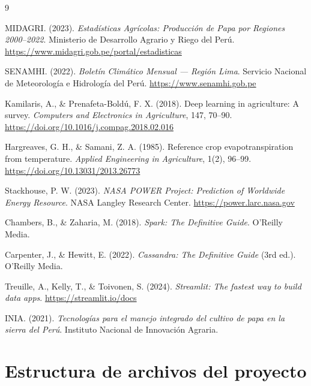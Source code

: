 \documentclass[12pt,a4paper]{article}
\begin{document}
\begin{thebibliography}{9}

MIDAGRI. (2023). \textit{Estadísticas Agrícolas: Producción de Papa por
Regiones 2000--2022}. Ministerio de Desarrollo Agrario y Riego del Perú.
\url{https://www.midagri.gob.pe/portal/estadisticas}

SENAMHI. (2022). \textit{Boletín Climático Mensual — Región Lima}.
Servicio Nacional de Meteorología e Hidrología del Perú.
\url{https://www.senamhi.gob.pe}

Kamilaris, A., \& Prenafeta-Boldú, F. X. (2018). Deep learning in
agriculture: A survey. \textit{Computers and Electronics in Agriculture},
147, 70--90. \url{https://doi.org/10.1016/j.compag.2018.02.016}

Hargreaves, G. H., \& Samani, Z. A. (1985). Reference crop
evapotranspiration from temperature. \textit{Applied Engineering in
Agriculture}, 1(2), 96--99. \url{https://doi.org/10.13031/2013.26773}

Stackhouse, P. W. (2023). \textit{NASA POWER Project: Prediction of
Worldwide Energy Resource}. NASA Langley Research Center.
\url{https://power.larc.nasa.gov}

Chambers, B., \& Zaharia, M. (2018). \textit{Spark: The Definitive Guide}.
O'Reilly Media.

Carpenter, J., \& Hewitt, E. (2022). \textit{Cassandra: The Definitive
Guide} (3rd ed.). O'Reilly Media.

Treuille, A., Kelly, T., \& Toivonen, S. (2024). \textit{Streamlit: The
fastest way to build data apps}. \url{https://streamlit.io/docs}

INIA. (2021). \textit{Tecnologías para el manejo integrado del cultivo de
papa en la sierra del Perú}. Instituto Nacional de Innovación Agraria.

\end{thebibliography}

\appendix
\section{Estructura de archivos del proyecto}
\end{document}
